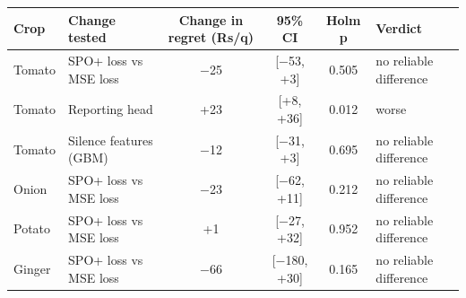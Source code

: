 \renewcommand{\arraystretch}{1.25}
\footnotesize
\begin{tabular}{|l|l|c|c|c|l|}
\hline
\textbf{Crop} & \textbf{Change tested} & \textbf{Change in regret (Rs/q)} & \textbf{95\% CI} & \textbf{Holm p} & \textbf{Verdict} \\
\hline
Tomato & SPO+ loss vs MSE loss & $-$25 & [$-$53, +3] & 0.505 & no reliable difference \\
\hline
Tomato & Reporting head & +23 & [+8, +36] & 0.012 & worse \\
\hline
Tomato & Silence features (GBM) & $-$12 & [$-$31, +3] & 0.695 & no reliable difference \\
\hline
Onion & SPO+ loss vs MSE loss & $-$23 & [$-$62, +11] & 0.212 & no reliable difference \\
\hline
Potato & SPO+ loss vs MSE loss & +1 & [$-$27, +32] & 0.952 & no reliable difference \\
\hline
Ginger & SPO+ loss vs MSE loss & $-$66 & [$-$180, +30] & 0.165 & no reliable difference \\
\hline
\end{tabular}
